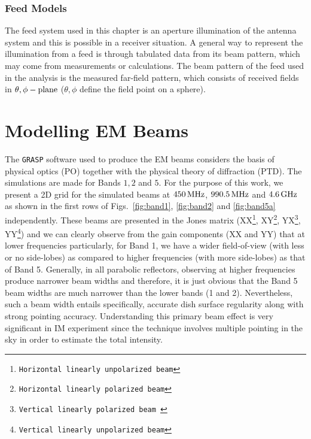 % 


\subsubsection{Feed Models}				  \label{chap6:feedspec} 

The feed system used in this chapter is an aperture illumination of the antenna system and this is possible in a receiver situation. A general way to represent the illumination from a feed is through tabulated data from its beam pattern, which may come from measurements or calculations. The beam pattern of the feed used in the analysis is the measured far-field pattern, which consists of received fields in $\theta, \phi \rm -plane$
($\theta, \phi$ define the field point on a sphere). 
%
\section{Modelling EM Beams}   \label{chap6:mdling}
The {\tt GRASP} software used to produce the EM beams considers the basis of physical optics (PO) together with the physical theory of diffraction (PTD). The simulations are made for Bands $1, 2$ and $5$. For the purpose of this work, we present a 2D grid for the simulated beams at $450 \, \rm MHz$, $990.5 \, \rm MHz$ and $4.6 \, \rm GHz$ as shown in the first rows of Figs.~\ref{fig:band1}, \ref{fig:band2} and \ref{fig:band5a} independently. These beams are presented in the Jones matrix (XX\footnote{{\tt Horizontal linearly unpolarized beam}}, XY\footnote{{\tt Horizontal linearly polarized beam}}, YX\footnote{{\tt Vertical linearly polarized beam }}, YY\footnote{{\tt Vertical linearly unpolarized beam}}) and we can clearly observe from the gain components (XX and YY) that at lower frequencies particularly, for Band 1, we have a wider field-of-view (with less or no side-lobes) as compared to higher frequencies (with more side-lobes) as that of Band 5. Generally, in all parabolic reflectors, observing at higher frequencies produce narrower beam widths and therefore, it is just obvious that the Band 5 beam widths are much narrower than the lower bands (1 and 2). Nevertheless, such a beam width entails specifically, accurate dish surface regularity along with strong pointing accuracy. 
Understanding this primary beam effect is very significant in IM experiment since the technique involves multiple pointing in the sky in order to estimate the total intensity.

